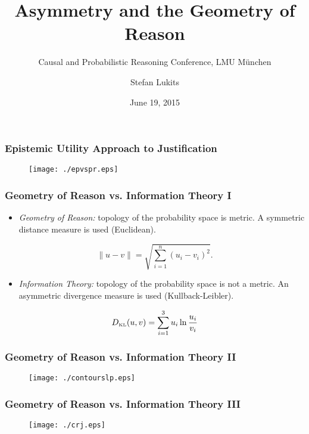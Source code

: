 \documentclass[xcolor=dvipsnames]{beamer}
\title{Asymmetry and the Geometry of Reason}
\subtitle{Causal and Probabilistic Reasoning Conference, LMU M{\"u}nchen}
\author{Stefan Lukits}
\date{June 19, 2015}
\begin{document}
\begin{frame}
  \titlepage
\end{frame}

\begin{frame}
  \frametitle{Epistemic Utility Approach to Justification}
  \begin{figure}[h]
    \texttt{[image: ./epvspr.eps]}
  \end{figure}
\end{frame}

\begin{frame}
  \frametitle{Geometry of Reason vs. Information Theory I}
  \begin{itemize}
  \item \emph{Geometry of Reason:} topology of the probability space is
    metric. A symmetric distance measure is used (Euclidean).
  \end{itemize}
\begin{equation}
  \label{eq:e3}
  \|u-v\|=\sqrt{\sum_{i=1}^{n}\left(u_{i}-v_{i}\right)^{2}}.
\end{equation}
  \begin{itemize}
  \item \emph{Information Theory:} topology of the probability space is not a
    metric. An asymmetric divergence measure is used (Kullback-Leibler).
  \end{itemize}
\begin{equation}
  \label{eq:e7}
  D_{\mbox{\tiny KL}}(u,v)=\sum_{i=1}^{3}u_{i}\ln\frac{u_{i}}{v_{i}}
\end{equation}
\end{frame}

\begin{frame}
  \frametitle{Geometry of Reason vs. Information Theory II}
  \begin{figure}[h]
    \texttt{[image: ./contourslp.eps]}
  \end{figure}
\end{frame}

\begin{frame}
  \frametitle{Geometry of Reason vs. Information Theory III}
  \begin{figure}[h]
    \texttt{[image: ./crj.eps]}
  \end{figure}
\end{frame}
\end{document}

